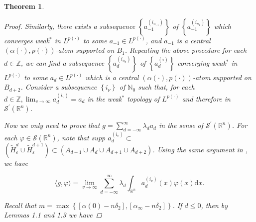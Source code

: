 \documentclass[oneside,reqno]{amsart}
\newtheorem{theorem}{Theorem}[section]
\numberwithin{equation}{section}
\theoremstyle{definition}
\begin{document}
\begin{theorem}
\begin{proof}
Similarly, there exists a subsequence $\left\{a_{-1}^{\left(i_{n_{-1}}\right)}\right\}$ of $\left\{a_{-1}^{\left(i_{n_{1}}\right)}\right\}$ which converges weak$^*$ in $L^{p(\cdot)}$ to some $a_{-1} \in L^{p(\cdot)}$, and $a_{-1}$ is a central $(\alpha(\cdot), p(\cdot))$-atom supported on $B_{1}$. Repeating the above procedure for each $d \in \mathbb{Z}$, we can find a subsequence $\left\{a_{d}^{\left(i_{n_{d}}\right)}\right\}$ of $\left\{a_{d}^{(i)}\right\}$ converging weak$^*$ in $L^{p(\cdot)}$ to some $a_{d} \in L^{p{(\cdot)}}$ which is a central $(\alpha(\cdot), p(\cdot))$-atom supported on $B_{d+2}$. Consider a subsequence $\left\{i_{\nu}\right\}$ of $\mathbb{N}_{0}$ such that, for each $d \in \mathbb{Z}, \lim _{v \rightarrow \infty} a_{d}^{\left(i_{v}\right)}=a_{d}$ in the weak$^*$ topology of $L^{p(\cdot)}$ and therefore in $\mathcal{S}^{\prime}\left(\mathbb{R}^{n}\right)$.

Now we only need to prove that $g=\sum_{d=-\infty}^{\infty} \lambda_{d} a_{d}$ in the sense of $\mathcal{S}^{\prime}\left(\mathbb{R}^{n}\right)$. For each $\varphi \in \mathcal{S}\left(\mathbb{R}^{n}\right)$, note that supp $a_{d}^{\left(i_{v}\right)} \subset$ $\left(\widetilde{H}^d_{ \varepsilon} \cup \widetilde{H}^{d+1}_{ \varepsilon}\right) \subset\left(A_{d-1} \cup A_{d} \cup A_{d+1} \cup A_{d+2}\right)$. Using the same argument in \cite{48}, we have


\begin{equation*}
\langle g, \varphi\rangle=\lim _{v \rightarrow \infty} \sum_{d=-\infty}^{\infty} \lambda_{d} \int_{\mathbb{R}^{n}} a_{d}^{\left(i_{v}\right)}(x) \varphi(x) \mathrm{d} x . 
\end{equation*}


Recall that $m=\max \left\{\left[\alpha(0)-n \delta_{2}\right],\left[\alpha_{\infty}-n \delta_{2}\right]\right\}$. If $d \leq  0$, then by Lemmas 1.1 and 1.3 we have



\end{proof}
\end{theorem}
\end{document}
